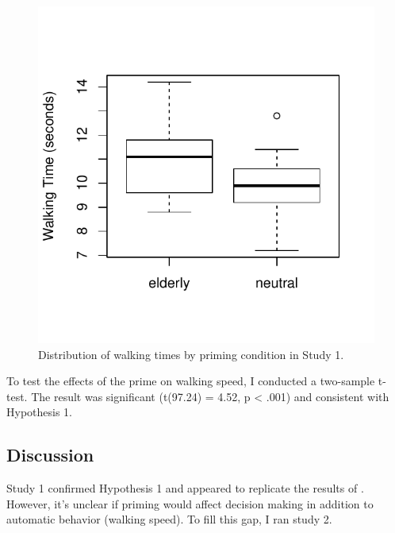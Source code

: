 \documentclass[a4paper,man,natbib,floatsintext]{apa6}\usepackage[]{graphicx}\usepackage[]{color}
\makeatletter
\def\maxwidth{ %
  \ifdim\Gin@nat@width>\linewidth
    \linewidth
  \else
    \Gin@nat@width
  \fi
}
\newenvironment{knitrout}{}{} %
\makeatother
\begin{document}
\begin{figure}
\begin{knitrout}
\color{fgcolor}

{\centering \includegraphics[width=\maxwidth]{figure/unnamed-chunk-4-1} 

}



\end{knitrout}
\caption{Distribution of walking times by priming condition in Study 1.}
\label{fig:s1times}
\end{figure}




To test the effects of the prime on walking speed, I conducted a two-sample t-test. The result was significant (t(97.24) = 4.52, p < .001) and consistent with Hypothesis 1.

\subsection{Discussion}

Study 1 confirmed Hypothesis 1 and appeared to replicate the results of \cite{bargh1996automaticity}. However, it's unclear if priming would affect decision making in addition to automatic behavior (walking speed). To fill this gap, I ran study 2.
\end{document}
